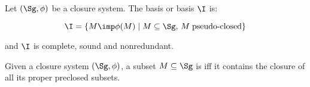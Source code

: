 \begin{definition} Let $(\Sg, \phi)$ be a 
	closure system. The  basis or  
	basis
	$\I$ is:
	
	\[ \I = \{ M \imp \phi(M) \; | \; M \subseteq \Sg, \, M \;
	\text{pseudo-closed} \} \]
	
	\noindent and $\I$ is complete, sound and nonredundant.
\end{definition}


\begin{definition} Given a closure system $(\Sg, \phi)$,
	a subset $M \subseteq \Sg$ is  iff it contains the 
	closure of
	all its proper preclosed subsets.
	
\end{definition}